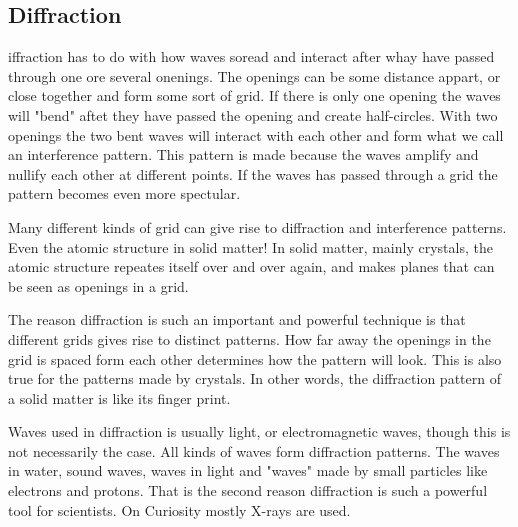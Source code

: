 \subsection{Diffraction}
iffraction has to do with how waves soread and interact after whay have passed through one ore several onenings.
The openings can be some distance appart, or close together and form some sort of grid.
If there is only one opening the waves will "bend" aftet they have passed the opening and create half-circles.
With two openings the two bent waves will interact with each other and form what we call an interference pattern.
This pattern is made because the waves amplify and nullify each other at different points.
If the waves has passed through a grid the pattern becomes even more spectular.

Many different kinds of grid can give rise to diffraction and interference patterns.
Even the atomic structure in solid matter!
In solid matter, mainly crystals, the atomic structure repeates itself over and over again, and makes planes that can be seen as openings in a grid.

The reason diffraction is such an important and powerful technique is that different grids gives rise to distinct patterns.
How far away the openings in the grid is spaced form each other determines how the pattern will look.
This is also true for the patterns made by crystals.
In other words, the diffraction pattern of a solid matter is like its finger print.

\begin{center}
\end{center}

Waves used in diffraction is usually light, or electromagnetic waves, though this is not necessarily the case.
All kinds of waves form diffraction patterns.
The waves in water, sound waves, waves in light and "waves" made by small particles like electrons and protons.
That is the second reason diffraction is such a powerful tool for scientists.
On Curiosity mostly X-rays are used.